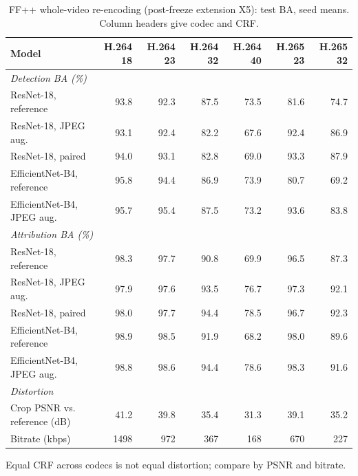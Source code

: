 \begin{table}[t]
\centering
\footnotesize
\caption{FF++ whole-video re-encoding (post-freeze extension X5): test BA, seed means. Column headers give codec and CRF.}
\label{tab:codec}
\setlength{\tabcolsep}{3.5pt}
\begin{tabular}{lrrrrrr}
\toprule
Model & H.264 18 & H.264 23 & H.264 32 & H.264 40 & H.265 23 & H.265 32 \\
\midrule
\multicolumn{7}{l}{\textit{Detection BA (\%)}} \\
ResNet-18, reference & 93.8 & 92.3 & 87.5 & 73.5 & 81.6 & 74.7 \\
ResNet-18, JPEG aug. & 93.1 & 92.4 & 82.2 & 67.6 & 92.4 & 86.9 \\
ResNet-18, paired & 94.0 & 93.1 & 82.8 & 69.0 & 93.3 & 87.9 \\
EfficientNet-B4, reference & 95.8 & 94.4 & 86.9 & 73.9 & 80.7 & 69.2 \\
EfficientNet-B4, JPEG aug. & 95.7 & 95.4 & 87.5 & 73.2 & 93.6 & 83.8 \\
\midrule
\multicolumn{7}{l}{\textit{Attribution BA (\%)}} \\
ResNet-18, reference & 98.3 & 97.7 & 90.8 & 69.9 & 96.5 & 87.3 \\
ResNet-18, JPEG aug. & 97.9 & 97.6 & 93.5 & 76.7 & 97.3 & 92.1 \\
ResNet-18, paired & 98.0 & 97.7 & 94.4 & 78.5 & 96.7 & 92.3 \\
EfficientNet-B4, reference & 98.9 & 98.5 & 91.9 & 68.2 & 98.0 & 89.6 \\
EfficientNet-B4, JPEG aug. & 98.8 & 98.6 & 94.4 & 78.6 & 98.3 & 91.6 \\
\midrule
\multicolumn{7}{l}{\textit{Distortion}} \\
Crop PSNR vs. reference (dB) & 41.2 & 39.8 & 35.4 & 31.3 & 39.1 & 35.2 \\
Bitrate (kbps) & 1498 & 972 & 367 & 168 & 670 & 227 \\
\bottomrule
\end{tabular}
\par\smallskip\parbox{\linewidth}{\scriptsize Equal CRF across codecs is not equal distortion; compare by PSNR and bitrate.}
\end{table}

